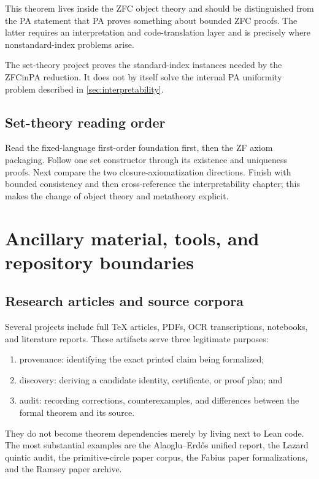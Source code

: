 \documentclass[
  10pt,
  a4paper,
  twoside,
  open=any,
  parskip=half,
  headings=big
]{scrreprt}
\begin{document}
This theorem lives inside the ZFC object theory and should be distinguished from the PA statement that PA proves something about bounded ZFC proofs. The latter requires an interpretation and code-translation layer and is precisely where nonstandard-index problems arise.

The set-theory project proves the standard-index instances needed by the ZFCinPA reduction. It does not by itself solve the internal PA uniformity problem described in \cref{sec:interpretability}.

\section{Set-theory reading order}

Read the fixed-language first-order foundation first, then the ZF axiom packaging. Follow one set constructor through its existence and uniqueness proofs. Next compare the two closure-axiomatization directions. Finish with bounded consistency and then cross-reference the interpretability chapter; this makes the change of object theory and metatheory explicit.

\chapter{Ancillary material, tools, and repository boundaries}
\label{ch:ancillary}

\section{Research articles and source corpora}

Several projects include full TeX articles, PDFs, OCR transcriptions, notebooks, and literature reports. These artifacts serve three legitimate purposes:

\begin{enumerate}
  \item provenance: identifying the exact printed claim being formalized;
  \item discovery: deriving a candidate identity, certificate, or proof plan; and
  \item audit: recording corrections, counterexamples, and differences between the formal theorem and its source.
\end{enumerate}

They do not become theorem dependencies merely by living next to Lean code. The most substantial examples are the Alaoglu--Erd\H{o}s unified report, the Lazard quintic audit, the primitive-circle paper corpus, the Fabius paper formalizations, and the Ramsey paper archive.
\end{document}
